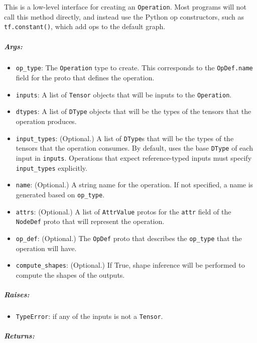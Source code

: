 This is a low-level interface for creating an \lstinline{Operation}. Most
programs will not call this method directly, and instead use the Python
op constructors, such as \lstinline{tf.constant()}, which add ops to the
default graph.

\subparagraph{Args: }\label{args-10}

\begin{itemize}
\tightlist
\item
  \lstinline{op_type}: The \lstinline{Operation} type to create. This
  corresponds to the \lstinline{OpDef.name} field for the proto that
  defines the operation.
\item
  \lstinline{inputs}: A list of \lstinline{Tensor} objects that will be inputs
  to the \lstinline{Operation}.
\item
  \lstinline{dtypes}: A list of \lstinline{DType} objects that will be the
  types of the tensors that the operation produces.
\item
  \lstinline{input_types}: (Optional.) A list of \lstinline{DType}s that will
  be the types of the tensors that the operation consumes. By default,
  uses the base \lstinline{DType} of each input in \lstinline{inputs}.
  Operations that expect reference-typed inputs must specify
  \lstinline{input_types} explicitly.
\item
  \lstinline{name}: (Optional.) A string name for the operation. If not
  specified, a name is generated based on \lstinline{op_type}.
\item
  \lstinline{attrs}: (Optional.) A list of \lstinline{AttrValue} protos for
  the \lstinline{attr} field of the \lstinline{NodeDef} proto that will
  represent the operation.
\item
  \lstinline{op_def}: (Optional.) The \lstinline{OpDef} proto that describes
  the \lstinline{op_type} that the operation will have.
\item
  \lstinline{compute_shapes}: (Optional.) If True, shape inference will be
  performed to compute the shapes of the outputs.
\end{itemize}

\subparagraph{Raises: }\label{raises-4}

\begin{itemize}
\tightlist
\item
  \lstinline{TypeError}: if any of the inputs is not a \lstinline{Tensor}.
\end{itemize}

\subparagraph{Returns: }\label{returns-12}

